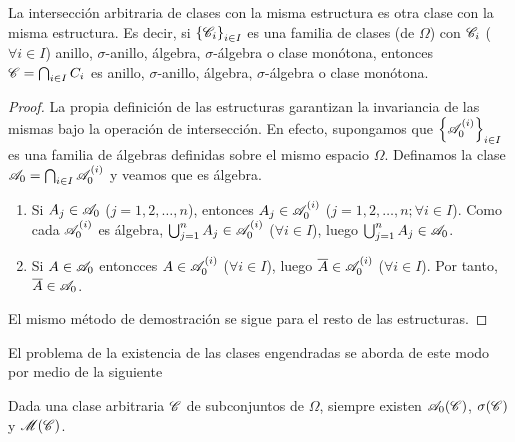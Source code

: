 \begin{lemma}
    La intersección arbitraria de clases con la misma estructura es otra clase con la misma estructura. Es decir, si $\left\lbrace\mathcal{C}_i\right\rbrace_{i\in I}$ es una familia de clases (de $\Omega$) con $\mathcal{C}_i$ ($\forall i\in I$) anillo, $\sigma$-anillo, álgebra, $\sigma$-álgebra o clase monótona, entonces $\mathcal{C}=\bigcap_{i\in I}C_i$ es anillo, $\sigma$-anillo, álgebra, $\sigma$-álgebra o clase monótona.
\end{lemma}

\begin{proof}
    La propia definición de las estructuras garantizan la invariancia de las mismas bajo la operación de intersección. En efecto, supongamos que $\left\lbrace\mathcal{A}_0^{(i)}\right\rbrace_{i\in I}$ es una familia de álgebras definidas sobre el mismo espacio $\Omega$. Definamos la clase $\mathcal{A}_0=\bigcap_{i\in I}\mathcal{A}_0^{(i)}$ y veamos que es álgebra.

    \begin{enumerate}
        \item Si $A_j\in\mathcal{A}_0$ ($j=1,2,\dots,n$), entonces $A_j\in\mathcal{A}_0^{(i)}$ ($j=1,2,\dots,n; \forall i\in I$). Como cada $\mathcal{A}_0^{(i)}$ es álgebra, $\bigcup_{j=1}^n A_j\in \mathcal{A}_0^{(i)}$ ($\forall i\in I$), luego $\bigcup_{j=1}^n A_j\in\mathcal{A}_0$.
        \item Si $A\in\mathcal{A}_0$ entoncces $A\in\mathcal{A}_0^{(i)}$ ($\forall i\in I$), luego $\overline{A}\in\mathcal{A}_0^{(i)}$ ($\forall i\in I$). Por tanto, $\overline{A}\in\mathcal{A}_0$.
    \end{enumerate}
    El mismo método de demostración se sigue para el resto de las estructuras.
\end{proof}

El problema de la existencia de las clases engendradas se aborda de este modo por medio de la siguiente

\begin{proposition}
    Dada una clase arbitraria $\mathcal{C}$ de subconjuntos de $\Omega$, siempre existen $\operatorname{\mathcal{A}_0}(\mathcal{C})$, $\operatorname{\sigma}(\mathcal{C})$ y $\operatorname{\mathcal{M}}(\mathcal{C})$.

\end{proposition}